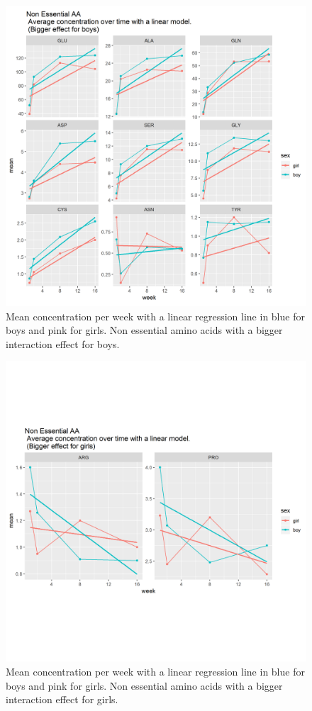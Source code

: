 \documentclass[12pt]{article}
\begin{document}
\begin{figure}[!htb]
  \centering
  \includegraphics[width=\textwidth]{../sexweek/NEAA_boys.png}
  \caption{Mean concentration per week with a linear regression line in blue for boys and pink for girls. Non essential amino acids with a bigger interaction effect for boys.}
  \label{fig:NEAA_boys}
\end{figure}


\begin{figure}[!htb]
  \centering
  \includegraphics[width=\textwidth]{../sexweek/NEAA_girls.png}
  \caption{Mean concentration per week with a linear regression line in blue for boys and pink for girls. Non essential amino acids with a bigger interaction effect for girls.}
  \label{fig:NEAA_girls}
\end{figure}
\end{document}
